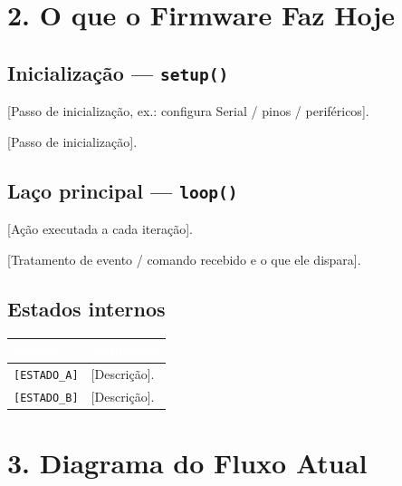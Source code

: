 \documentclass{anafw}
\begin{document}
\section{2. O que o Firmware Faz Hoje}

\subsection{Inicialização — \texttt{setup()}}

\begin{listaItens}
  \item {[Passo de inicialização, ex.: configura Serial / pinos / periféricos]}.
  \item {[Passo de inicialização]}.
\end{listaItens}

\subsection{Laço principal — \texttt{loop()}}

\begin{listaItens}
  \item {[Ação executada a cada iteração]}.
  \item {[Tratamento de evento / comando recebido e o que ele dispara]}.
\end{listaItens}

\subsection{Estados internos}

\begin{tabularx}{\linewidth}{@{} l X @{}}
  \toprule
  \rowcolor{primario}
  \textcolor{white}{\textbf{Estado}} & \textcolor{white}{\textbf{Significado}} \\
  \midrule
  \texttt{[ESTADO\_A]} & [Descrição]. \\[3pt]
  \texttt{[ESTADO\_B]} & [Descrição]. \\
  \bottomrule
\end{tabularx}


\section{3. Diagrama do Fluxo Atual}
\end{document}
